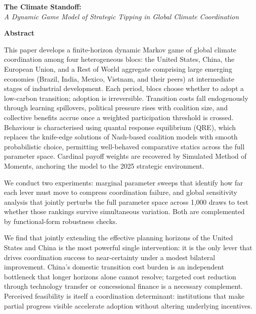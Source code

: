 \documentclass[10pt,a4paper]{article}
\begin{document}
\begin{titlepage}
\vspace*{0.4cm}
{\noindent\LARGE\textbf{The Climate Standoff:}\\[0.3em]
\large\textit{A Dynamic Game Model of Strategic Tipping in Global Climate Coordination}
\par}

\vspace{0.8cm}

\textbf{Abstract}

\medskip
This paper develops a finite-horizon dynamic Markov game of global climate coordination among four
heterogeneous blocs: the United States, China, the European Union, and a Rest of World aggregate
comprising large emerging economies (Brazil, India, Mexico, Vietnam, and their peers) at
intermediate stages of industrial development. Each period, blocs choose whether to adopt a low-carbon
transition; adoption is irreversible. Transition costs fall endogenously through learning spillovers, political
pressure rises with coalition size, and collective benefits accrue once a weighted participation threshold is
crossed. Behaviour is characterised using quantal response equilibrium (QRE), which replaces the
knife-edge solutions of Nash-based coalition models with smooth probabilistic choice, permitting
well-behaved comparative statics across the full parameter space. Cardinal payoff weights are recovered by
Simulated Method of Moments, anchoring the model to the 2025 strategic environment.

We conduct two experiments: marginal parameter sweeps that identify how far each lever must move to compress coordination failure, and global sensitivity analysis that jointly perturbs the full parameter space across 1,000 draws to test whether those rankings survive simultaneous variation. Both are complemented by functional-form robustness checks.

We find that jointly extending the effective planning horizons of the United States and China is the most
powerful single intervention: it is the only lever that drives coordination success to near-certainty under a
modest bilateral improvement. China's domestic transition cost burden is an independent bottleneck that
longer horizons alone cannot resolve; targeted cost reduction through technology transfer or concessional
finance is a necessary complement. Perceived feasibility is itself a coordination determinant: institutions
that make partial progress visible accelerate adoption without altering underlying incentives.


\end{titlepage}
\end{document}
